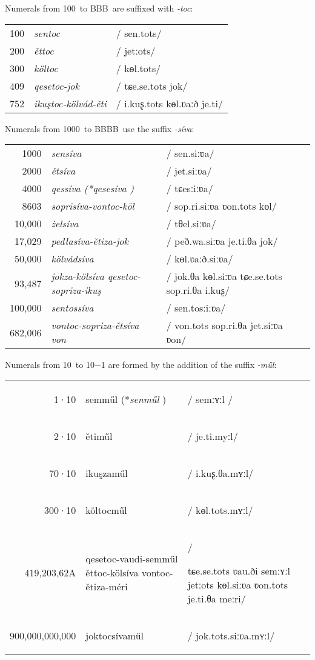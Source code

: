 \documentclass[grammar]{subfiles}
\begin{document}
	Numerals from 100\duo\ to BBB\duo\ are suffixed with \emph{-toc}:

	\begin{exe}
		\ex
		\begin{tabular}[t]{r >{\itshape}l >{/}l<{/}}
			100\duo & sentoc & sen.tots\\
			200\duo & ěttoc & jetːots\\
			300\duo & költoc & kɵl.tots\\
			409\duo & qesetoc-jok & tɕe.se.tots jok\\
			752\duo & ikuştoc-kölvád-ěti & i.kuʂ.tots kɵl.ʋaːð je.ti\\
		\end{tabular}
	\end{exe}

	Numerals from 1000\duo\ to BBBB\duo\  use the suffix \emph{-síva}:

	\begin{exe}
		\ex
		\begin{tabular}[t]{r >{\itshape}l >{/}l<{/}}
			1000\duo    & sensíva & sen.siːʋa\\
			2000\duo    & ětsíva & jet.siːʋa\\
			4000\duo    & qessíva \textup{(*\emph{qesesíva} )} & tɕesːiːʋa\\
			8603\duo    & soprisíva-vontoc-köl & sop.ri.siːʋa ʋon.tots kɵl\\
			10,000\duo  & żelsíva & tθel.siːʋa\\
			17,029\duo  & pedłasíva-ětiza-jok & peð.wa.siːʋa je.ti.θa jok\\
			50,000\duo  & kölvádsíva & kɵl.ʋaːð.siːʋa\\
			93,487\duo  & jokza-kölsíva qesetoc-sopriza-ikuş & jok.θa kɵl.siːʋa tɕe.se.tots sop.ri.θa i.kuʂ\\
			100,000\duo & sentossíva & sen.tosːiːʋa\\
			682,006\duo & vontoc-sopriza-ětsíva von & von.tots sop.ri.θa jet.siːʋa ʋon\\
		\end{tabular}
	\end{exe}

	\newpage
	Numerals from 10\duo\ to 10\duo−1 are formed by the addition of the suffix \emph{-műl}:

	\begin{exe}
		\ex
		\begin{tabular}[t]{r >{\itshape\raggedright}m{5cm} >{/}m{4cm}<{/}}
			1·10\sup6\duo       & semműl \textup{(*\emph{senműl} )} & semːʏːl \\
			2·10\sup6\duo       & ětiműl & je.ti.myːl\\
			70·10\sup6\duo      & ikuşzaműl & i.kuʂ.θa.mʏːl\\
			300·10\sup6\duo     & költocműl & kɵl.tots.mʏːl\\
			419,203,62A\duo     & qesetoc-vaudi-semműl ěttoc-kölsíva vontoc-ětiza-méri & \raggedright tɕe.se.tots ʋau.ði semːʏːl jetːots kɵl.siːʋa ʋon.tots je.ti.θa meːri\tabularnewline
			900,000,000,000\duo & joktocsívaműl & jok.tots.siːʋa.mʏːl\\
		\end{tabular}
	\end{exe}
\end{document}
